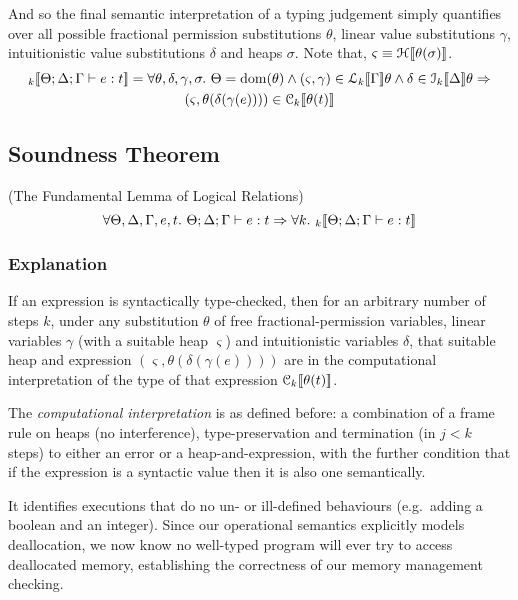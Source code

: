 And so the final semantic interpretation of a typing judgement simply
quantifies over all possible fractional permission substitutions $\theta$,
linear value substitutions $\gamma$, intuitionistic value substitutions
$\delta$ and heaps $\sigma$. Note that, $\varsigma \equiv \mathcal{H}_{} [\![ \theta(\sigma) ]\!]$.
\begin{align*}
\den{}{k}{ \Theta; \Delta ; \Gamma \vdash e : t } &= \forall \theta, \delta, \gamma, \sigma.\ \Theta = \dom(\theta) \wedge (\varsigma, \gamma) \in \den{L}{k}{ \Gamma }\theta \wedge \delta \in \den{I}{k}{ \Delta }\theta \Rightarrow \\
                                                  &  \qquad \qquad (\varsigma, \theta(\delta(\gamma(e)))) \in \C{k}{ \theta(t) }
\end{align*}

\subsection{Soundness Theorem}

\begin{theorem}
(The Fundamental Lemma of Logical Relations)
\[
    \forall \Theta, \Delta, \Gamma, e, t.\ \Theta; \Delta ; \Gamma \vdash e : t \Rightarrow
    \forall k.\ \mathcal{}_{k} [\![  \Theta; \Delta ; \Gamma \vdash e : t  ]\!]
\]
\end{theorem}

\subsubsection{Explanation}

If an expression is syntactically type-checked, then for an arbitrary number of
steps $k$, under any substitution $\theta$ of free fractional-permission
variables, linear variables $\gamma$ (with a suitable heap $\varsigma$) and
intuitionistic variables $\delta$, that suitable heap and expression
$(\varsigma, \theta(\delta(\gamma(e))))$ are in the computational
interpretation of the type of that expression $\mathcal{C}_{k} [\![  \theta(t)  ]\!]$.

The \emph{computational interpretation} is as defined before: a combination of
a frame rule on heaps (no interference), type-preservation and termination (in
$j < k$ steps) to either an error or a heap-and-expression, with the further
condition that if the expression is a syntactic value then it is also one
semantically.

It identifies executions that do no un- or ill-defined behaviours (e.g.\ adding
a boolean and an integer). Since our operational semantics explicitly models
deallocation, we now know no well-typed program will ever try to access
deallocated memory, establishing the correctness of our memory management
checking.

